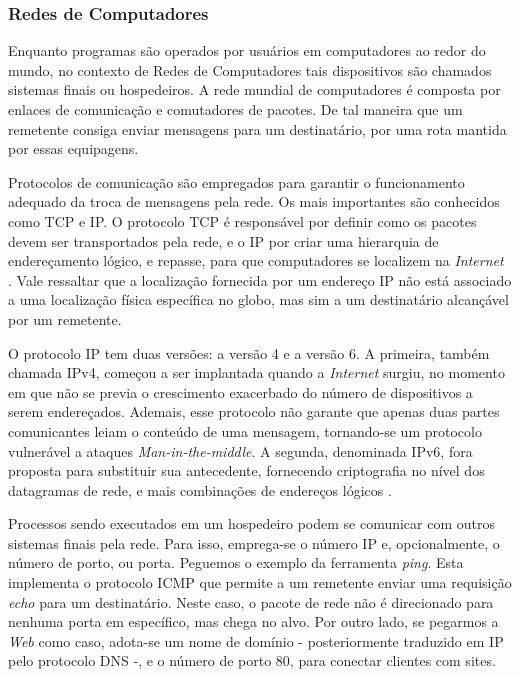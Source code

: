     \subsubsection{Redes de Computadores}
    
    \hspace{1cm}
    Enquanto programas são operados por usuários em computadores ao redor do mundo, no contexto de Redes de Computadores tais dispositivos são chamados sistemas finais ou hospedeiros. A rede mundial de computadores é composta por enlaces de comunicação e comutadores de pacotes. De tal maneira que um remetente consiga enviar mensagens para um destinatário, por uma rota mantida por essas equipagens.
    
    \vspace{4mm}
    
    \hspace{1cm}
    Protocolos de comunicação são empregados para garantir o funcionamento adequado da troca de mensagens pela rede. Os mais importantes são conhecidos como TCP e IP. O protocolo TCP é responsável por definir como os pacotes devem ser transportados pela rede, e o IP por criar uma hierarquia de endereçamento lógico, e repasse, para que computadores se localizem na \textit{Internet} \cite{kurose2013}. Vale ressaltar que a localização fornecida por um endereço IP não está associado a uma localização física específica no globo, mas sim a um destinatário alcançável por um remetente.
    
    \vspace{4mm}
    
    \hspace{1cm}
    O protocolo IP tem duas versões: a versão 4 e a versão 6. A primeira, também chamada IPv4, começou a ser implantada quando a \textit{Internet} surgiu, no momento em que não se previa o crescimento exacerbado do número de dispositivos a serem endereçados. Ademais, esse protocolo não garante que apenas duas partes comunicantes leiam o conteúdo de uma mensagem, tornando-se um protocolo vulnerável a ataques \textit{Man-in-the-middle}. A segunda, denominada IPv6, fora proposta para substituir sua antecedente, fornecendo criptografia no nível dos datagramas de rede, e mais combinações de endereços lógicos \cite{kurose2013}.
    
    \vspace{4mm}
    
    \hspace{1cm}
    Processos sendo executados em um hospedeiro podem se comunicar com outros sistemas finais pela rede. Para isso, emprega-se o número IP e, opcionalmente, o número de porto, ou porta. Peguemos o exemplo da ferramenta \textit{ping}. Esta implementa o protocolo ICMP que permite a um remetente enviar uma requisição \textit{echo} para um destinatário. Neste caso, o pacote de rede não é direcionado para nenhuma porta em específico, mas chega no alvo. Por outro lado, se pegarmos a \textit{Web} como caso, adota-se um nome de domínio - posteriormente traduzido em IP pelo protocolo DNS -, e o número de porto 80, para conectar clientes com sites.
    
